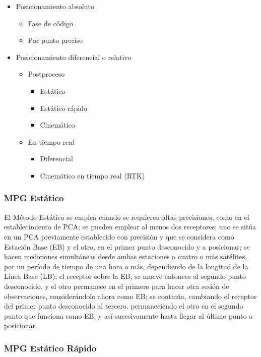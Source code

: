 \begin{itemize}
    \item Posicionamiento absoluto
    \begin{itemize}
        \item Fase de código
        \item Por punto preciso
    \end{itemize}
    \item Posicionamiento diferencial o relativo
    \begin{itemize}
        \item Postproceso
        \begin{itemize}
            \item Estático
            \item Estático rápido
            \item Cinemático
        \end{itemize}
        \item En tiempo real
        \begin{itemize}
            \item Diferencial
            \item Cinemático en tiempo real (RTK)
        \end{itemize}
    \end{itemize}
\end{itemize}

\subsubsection{MPG Estático}

El Método Estático se emplea cuando se requieren altas precisiones, como en el establecimiento de PCA; se pueden emplear al menos dos receptores; uno se sitúa en un PCA previamente establecido con precisión y que se considera como Estación Base (EB) y el otro, en el primer punto desconocido y a posicionar; se hacen mediciones simultáneas desde ambas estaciones a cuatro o más satélites, por un período de tiempo de una hora o más, dependiendo de la longitud de la Línea Base (LB); el receptor sobre la EB, se mueve entonces al segundo punto desconocido, y el otro permanece en el primero para hacer otra sesión de observaciones, considerándolo ahora como EB; se continúa, cambiando el receptor del primer punto desconocido al tercero. permaneciendo el otro en el segundo punto que funciona como EB, y así sucesivamente hasta llegar al último punto a posicionar.

\subsubsection{MPG Estático Rápido}

